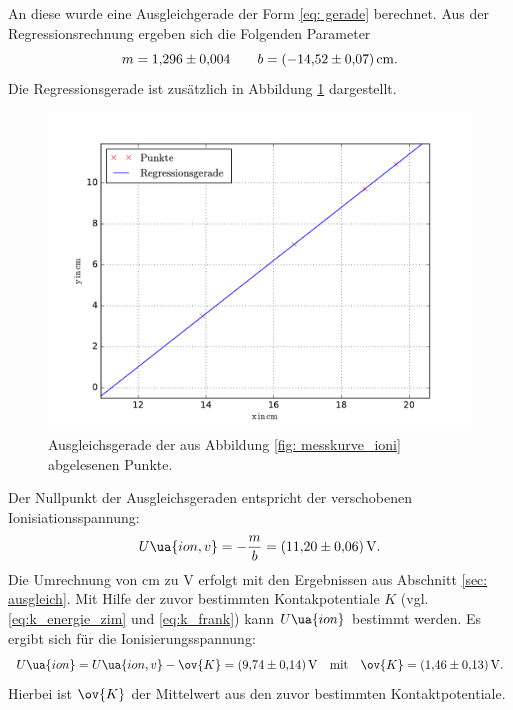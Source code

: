 
An diese wurde eine Ausgleichgerade der Form \eqref{eq: gerade} berechnet.
Aus der Regressionsrechnung ergeben sich die Folgenden Parameter
\begin{equation*}
  m=\num{1.296\pm0.004} \qquad b=\SI{-14.52\pm0.07}{\centi\meter}.
\end{equation*}
Die Regressionsgerade ist zusätzlich in Abbildung \ref{fig: ioni_fit} dargestellt.
\begin{figure}
  \centering
  \includegraphics[width=0.8 \textwidth]{../Messdaten/gerade_io_final.pdf}
  \caption{Ausgleichsgerade der aus Abbildung \ref{fig: messkurve_ioni} abgelesenen Punkte.}
  \label{fig: ioni_fit}
\end{figure}
Der Nullpunkt der Ausgleichsgeraden entspricht der verschobenen
Ionisiationsspannung:
\begin{equation*}
  U\ua{ion,v}=-\frac{m}{b}=\SI{11.20\pm0.06}{\volt}.
\end{equation*}
Die Umrechnung von $\si{\centi\meter}$ zu $\si{\volt}$ erfolgt mit den Ergebnissen aus
Abschnitt \ref{sec: ausgleich}.
Mit Hilfe der zuvor bestimmten Kontakpotentiale $K$ (vgl. \eqref{eq:k_energie_zim} und \eqref{eq:k_frank})
kann $U\ua{ion}$ bestimmt werden. Es ergibt sich für die Ionisierungsspannung:
\begin{equation}
  \label{eq: u_ion}
  U\ua{ion}= U\ua{ion,v}-\ov{K}=\SI{9.74\pm0.14}{\volt} \quad \text{mit} \quad \ov{K}=\SI{1.46\pm0.13}{\volt}.
\end{equation}
Hierbei ist $\ov{K}$ der Mittelwert aus den zuvor bestimmten Kontaktpotentiale. %
\FloatBarrier
